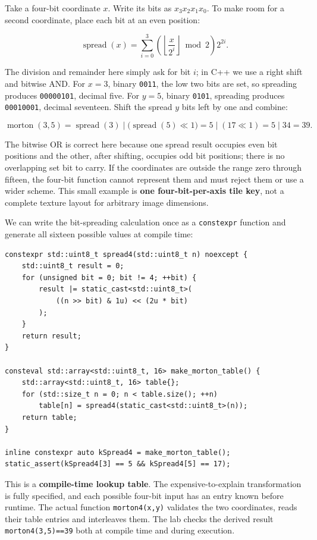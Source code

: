Take a four-bit coordinate \(x\). Write its bits as \(x_3x_2x_1x_0\). To make room for a second coordinate, place each bit at an even position:

\[
\operatorname{spread}(x)
=\sum_{i=0}^{3} \left(\left\lfloor\frac{x}{2^i}\right\rfloor\bmod 2\right)2^{2i}.
\]

The division and remainder here simply ask for bit \(i\); in C++ we use a right shift and bitwise AND. For \(x=3\), binary \texttt{0011}, the low two bits are set, so spreading produces \texttt{00000101}, decimal five. For \(y=5\), binary \texttt{0101}, spreading produces \texttt{00010001}, decimal seventeen. Shift the spread \(y\) bits left by one and combine:

\[
\operatorname{morton}(3,5)
=\operatorname{spread}(3)\;|\;
\big(\operatorname{spread}(5)\ll 1\big)
=5\;|\;(17\ll1)
=5\;|\;34
=39.
\]

The bitwise OR is correct here because one spread result occupies even bit positions and the other, after shifting, occupies odd bit positions; there is no overlapping set bit to carry. If the coordinates are outside the range zero through fifteen, the four-bit function cannot represent them and must reject them or use a wider scheme. This small example is \textbf{one four-bit-per-axis tile key}, not a complete texture layout for arbitrary image dimensions.

We can write the bit-spreading calculation once as a \texttt{constexpr} function and generate all sixteen possible values at compile time:

\begin{verbatim}
constexpr std::uint8_t spread4(std::uint8_t n) noexcept {
    std::uint8_t result = 0;
    for (unsigned bit = 0; bit != 4; ++bit) {
        result |= static_cast<std::uint8_t>(
            ((n >> bit) & 1u) << (2u * bit)
        );
    }
    return result;
}

consteval std::array<std::uint8_t, 16> make_morton_table() {
    std::array<std::uint8_t, 16> table{};
    for (std::size_t n = 0; n < table.size(); ++n)
        table[n] = spread4(static_cast<std::uint8_t>(n));
    return table;
}

inline constexpr auto kSpread4 = make_morton_table();
static_assert(kSpread4[3] == 5 && kSpread4[5] == 17);
\end{verbatim}

This is a \textbf{compile-time lookup table}. The expensive-to-explain transformation is fully specified, and each possible four-bit input has an entry known before runtime. The actual function \texttt{morton4(x,y)} validates the two coordinates, reads their table entries and interleaves them. The lab checks the derived result \texttt{morton4(3,5)==39} both at compile time and during execution.

